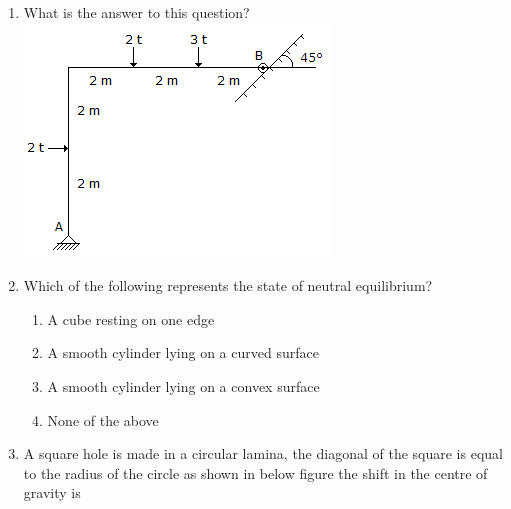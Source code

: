 \documentclass[11pt,a4paper]{article}
\begin{document}
\begin{enumerate}
{}
\\
\item{What is the answer to this question? \\

\includegraphics{../data_img/applied-mechanics-and-graphic-statics_1525414834-5.png}
}
\\
\item{Which of the following represents the state of neutral equilibrium?}
\begin{enumerate}[label=\Alph*.]
\item{A cube resting on one edge}
\item{A smooth cylinder lying on a curved surface}
\item{A smooth cylinder lying on a convex surface}
\item{None of the above}
\end{enumerate}
\item{A square hole is made in a circular lamina, the diagonal of the square is equal to the radius of the circle as shown in below figure the shift in the centre of gravity is \\

}
\end{enumerate}
\end{document}
